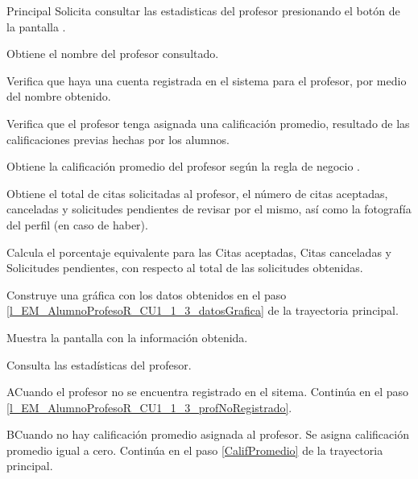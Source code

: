 \begin{UCtrayectoria}{Principal}
	\UCpaso [\UCactor] Solicita consultar las estadisticas del profesor presionando el botón  de la pantalla .

	\UCpaso Obtiene el nombre del profesor consultado. 

	\UCpaso Verifica que haya una cuenta registrada en el sistema para el profesor, por medio del nombre obtenido.

	\UCpaso Verifica que el profesor tenga asignada una calificación promedio, resultado de las calificaciones previas hechas por los alumnos.  

	\UCpaso Obtiene la calificación promedio del profesor según la regla de negocio . \label{CalifPromedio}  

	\UCpaso Obtiene el total de citas solicitadas al profesor, el número de citas aceptadas, canceladas y solicitudes pendientes de revisar por el mismo, así como la fotografía del perfil (en caso de haber). 

	\UCpaso Calcula el porcentaje equivalente para las Citas aceptadas, Citas canceladas y Solicitudes pendientes, con respecto al total de las solicitudes obtenidas. \label{l_EM_AlumnoProfesoR_CU1_1_3_datosGrafica}

	\UCpaso Construye una gráfica con los datos obtenidos en el paso \ref{l_EM_AlumnoProfesoR_CU1_1_3_datosGrafica} de la trayectoria principal.

	\UCpaso Muestra la pantalla  con la información obtenida. \label{l_EM_AlumnoProfesoR_CU1_1_3_profNoRegistrado}
	
	\UCpaso [\UCactor] Consulta las estadísticas del profesor.

\end{UCtrayectoria}

\begin{UCtrayectoriaA}{A}{Cuando el profesor no se encuentra registrado en el sitema.}
	\UCpaso	Continúa en el paso \ref{l_EM_AlumnoProfesoR_CU1_1_3_profNoRegistrado}.
\end{UCtrayectoriaA}

\begin{UCtrayectoriaA}{B}{Cuando no hay calificación promedio asignada al profesor.}
	\UCpaso	Se asigna calificación promedio igual a cero.
	\UCpaso Continúa en el paso \ref{CalifPromedio} de la trayectoria principal.
\end{UCtrayectoriaA}


